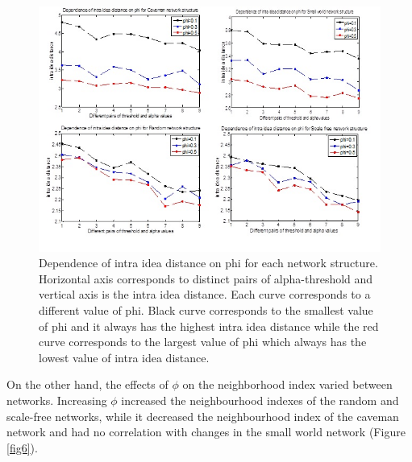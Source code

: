 \begin{figure}
[htp]
\begin{center}
\includegraphics{Fig5}
\end{center}
\caption{Dependence of intra idea distance on phi for each network structure. Horizontal axis corresponds to distinct pairs of alpha-threshold and   vertical axis is the intra idea distance. Each curve corresponds to a different value of phi. Black curve corresponds to the smallest value of phi and it always has the highest intra idea distance while the red curve corresponds to the largest value of phi which always has the lowest value of intra idea distance.}
\label {fig5}
\end{figure}

On the other hand, the effects of $\phi$ on the neighborhood index varied between networks. Increasing $\phi$ increased the neighbourhood indexes of the random and scale-free networks, while it decreased the neighbourhood index of the caveman network and had no correlation with changes in the small world network (Figure \ref{fig6}).

